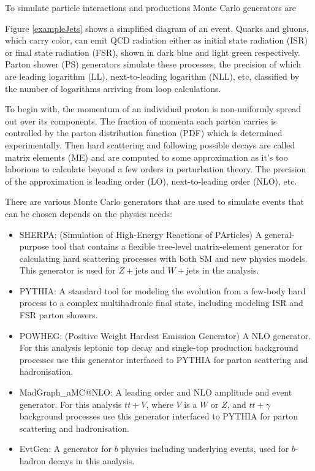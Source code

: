 To simulate particle interactions and productions Monte Carlo generators are 

Figure \ref{exampleJets} shows a simplified diagram of an event.  Quarks and gluons, which carry color, can emit QCD radiation either as initial state radiation (ISR) or final state radiation (FSR), shown in dark blue and light green respectively.  Parton shower (PS) generators simulate these processes, the precision of which are leading logarithm (LL), next-to-leading logarithm (NLL), etc, classified by the number of logarithms arriving from loop calculations.  

To begin with, the momentum of an individual proton is non-uniformly spread out over its components.  The fraction of momenta each parton carries is controlled by the parton distribution function (PDF) which is determined experimentally.  Then hard scattering and following possible decays are called matrix elements (ME) and are computed to some approximation as it's too laborious to calculate beyond a few orders in perturbation theory.  The precision of the approximation is leading order (LO), next-to-leading order (NLO), etc. 

There are various Monte Carlo generators that are used to simulate events that can be chosen depends on the physics needs:

\begin{itemize}
	\item SHERPA\cite{sherpa}:  (Simulation of High-Energy Reactions of PArticles) A general-purpose tool that contains a flexible tree-level matrix-element generator for calculating hard scattering processes with both SM and new physics models.  This generator is used for $Z+$jets and $W+$jets in the analysis.
	\item PYTHIA\cite{pythia8}: A standard tool for modeling the evolution from a few-body hard process to a complex multihadronic final state, including modeling ISR and FSR parton showers.
	\item POWHEG\cite{powheg-box}: (Positive Weight Hardest Emission Generator) A NLO generator.  For this analysis leptonic top decay and single-top production background processes use this generator interfaced to PYTHIA for parton scattering and hadronisation.  
	\item MadGraph_aMC@NLO\cite{madgraph}: A leading order and NLO amplitude and event generator.  For this analysis $tt+V$, where $V$ is a $W$ or $Z$, and $tt+\gamma$ background processes use this generator interfaced to PYTHIA for parton scattering and hadronisation.  
	\item EvtGen\cite{evtGen}: A generator for $b$ physics including underlying events, used for $b$-hadron decays in this analysis.
\end{itemize}

